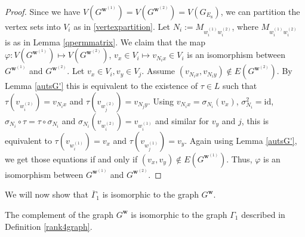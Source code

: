\begin{proof}
Since we have $V(G^{\boldsymbol{w}^{(1)}})=V(G^{\boldsymbol{w}^{(2)}})=V(G_{E_8})$, we can partition the vertex sets into $V_i$ as in \eqref{vertexpartition}. Let $N_i:=M_{w_i^{(1)}w_i^{(2)}}$, where $M_{w_i^{(1)}w_i^{(2)}}$ is as in Lemma \ref{qpermmatrix}. We claim that the map $\varphi:V(G^{\boldsymbol{w}^{(1)}})\mapsto V(G^{\boldsymbol{w}^{(2)}})$, $v_x \in V_i\mapsto v_{N_ix}\in V_i$ is an isomorphism between $G^{\boldsymbol{w}^{(1)}}$ and $G^{\boldsymbol{w}^{(2)}}$. Let $v_x\in V_i, v_y\in  V_j$. Assume $(v_{N_ix}, v_{N_iy})\notin E(G^{\boldsymbol{w}^{(2)}})$. By Lemma \ref{autsG'} this is equivalent to the existence of $\tau \in L$ such that $\tau(v_{w_i^{(2)}})=v_{N_ix}$ and $\tau(v_{w_j^{(2)}})=v_{N_jy}$. Using $v_{N_ix}=\sigma_{N_i}(v_x)$, $\sigma_{N_i}^2=\mathrm{id}$,  $\sigma_{N_i}\circ \tau=\tau \circ \sigma_{N_i}$ and $\sigma_{N_i}(v_{w_i^{(2)}})=v_{w_i^{(1)}}$ and similar for $v_y$ and $j$, this is equivalent to $\tau(v_{w_i^{(1)}})=v_x$ and $\tau(v_{w_j^{(1)}})=v_y$. Again using Lemma \ref{autsG'}, we get those equations if and only if $(v_x,v_y)\notin E(G^{\boldsymbol{w}^{(1)}})$. Thus, $\varphi$ is an isomorphism between $G^{\boldsymbol{w}^{(1)}}$ and $G^{\boldsymbol{w}^{(2)}}$. 
\end{proof}

We will now show that $\overline{\Gamma}_1$ is isomorphic to the graph $G^{\boldsymbol{w}}$. 

\begin{theo}\label{isographs}
The complement of the graph $G^{\boldsymbol{w}}$ is isomorphic to the graph $\Gamma_1$ described in Definition \ref{rank4graph}.
\end{theo}

